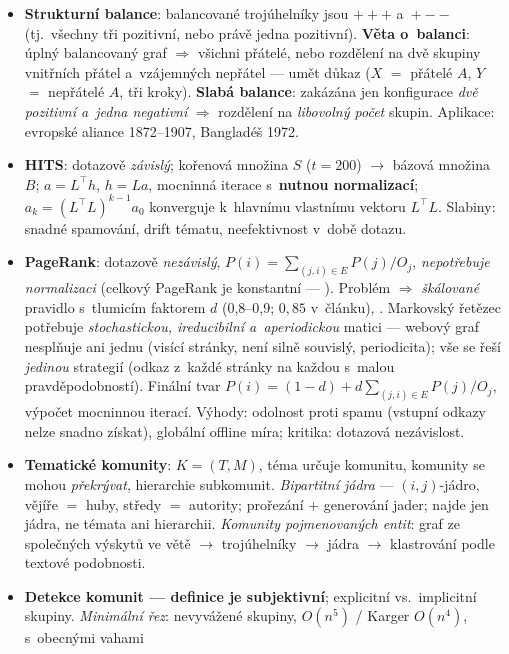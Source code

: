 \documentclass[11pt,a4paper]{article}
\theoremstyle{definition}
\begin{document}
\begin{itemize}
\item \textbf{Strukturní balance}: balancované trojúhelníky jsou $+{+}{+}$ a~$+{-}{-}$
      (tj.\ všechny tři pozitivní, nebo právě jedna pozitivní). \textbf{Věta o~balanci}: úplný
      balancovaný graf $\Rightarrow$ všichni přátelé, nebo rozdělení na dvě skupiny vnitřních
      přátel a~vzájemných nepřátel --- umět důkaz ($X$ $=$ přátelé $A$, $Y$ $=$ nepřátelé
      $A$, tři kroky). \textbf{Slabá balance}: zakázána jen konfigurace \emph{dvě pozitivní
      a~jedna negativní} $\Rightarrow$ rozdělení na \emph{libovolný počet} skupin. Aplikace:
      evropské aliance 1872--1907, Bangladéš 1972.
\item \textbf{HITS}: dotazově \emph{závislý}; kořenová množina $S$ ($t=200$) $\to$ bázová
      množina $B$; $a=L^{\!\top}h$, $h=La$, mocninná iterace s~\textbf{nutnou normalizací};
      $a_k=(L^{\!\top}L)^{k-1}a_0$ konverguje k~hlavnímu vlastnímu vektoru $L^{\!\top}L$.
      Slabiny: snadné spamování, drift tématu, neefektivnost v~době dotazu.
\item \textbf{PageRank}: dotazově \emph{nezávislý}, $P(i)=\sum_{(j,i)\in E}P(j)/O_j$,
      \emph{nepotřebuje normalizaci} (celkový PageRank je konstantní --- ).
      Problém  $\Rightarrow$ \emph{škálované} pravidlo s~tlumicím faktorem
      $d$ (0,8--0,9; $0{,}85$ v~článku), . Markovský řetězec potřebuje
      \emph{stochastickou, ireducibilní a~aperiodickou} matici --- webový graf nesplňuje ani
      jednu (visící stránky, není silně souvislý, periodicita); vše se řeší \emph{jedinou}
      strategií (odkaz z~každé stránky na každou s~malou pravděpodobností). Finální tvar
      $P(i)=(1-d)+d\sum_{(j,i)\in E}P(j)/O_j$, výpočet mocninnou iterací. Výhody: odolnost
      proti spamu (vstupní odkazy nelze snadno získat), globální offline míra; kritika:
      dotazová nezávislost.
\item \textbf{Tematické komunity}: $K=(T,M)$, téma určuje komunitu, komunity se mohou
      \emph{překrývat}, hierarchie subkomunit. \emph{Bipartitní jádra} --- $(i,j)$-jádro,
      vějíře $=$ huby, středy $=$ autority; prořezání $+$ generování jader; najde jen jádra,
      ne témata ani hierarchii. \emph{Komunity pojmenovaných entit}: graf ze společných výskytů
      ve větě $\to$ trojúhelníky $\to$ jádra $\to$ klastrování podle textové podobnosti.
\item \textbf{Detekce komunit --- definice je subjektivní}; explicitní vs.\ implicitní skupiny.
      \emph{Minimální řez}: nevyvážené skupiny, $O(n^5)$ / Karger $O(n^4)$, s~obecnými vahami

\end{itemize}
\end{document}

